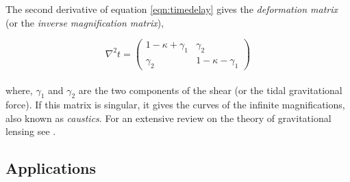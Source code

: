 The second derivative of equation \ref{eqn:timedelay} gives the
{\it deformation matrix} (or the {\it inverse magnification matrix}),

\begin{equation}
	\nabla^2 t = \begin{pmatrix}
 				 1-\kappa+\gamma_1 &  \gamma_2 \\
  					\gamma_2 & 1-\kappa-\gamma_1
 				\end{pmatrix}
\end{equation}
\\
where, $\gamma_1$ and $\gamma_2$ are the two components of the shear (or the tidal
gravitational force). If this matrix is singular, it gives the curves of the
infinite magnifications, also known as {\it caustics}.
For an extensive review on the theory of gravitational
lensing see \citep{1992grle.book.....S,2001stgl.book.....P,2006glsw.conf.....M}.


\subsection{Applications}

